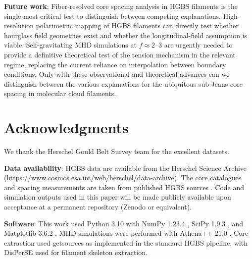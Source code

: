 \documentclass[11pt,a4paper]{article}
\begin{document}
\textbf{Future work}: Fiber-resolved core spacing analysis in HGBS filaments is the single most critical test to distinguish between competing explanations. High-resolution polarimetric mapping of HGBS filaments can directly test whether hourglass field geometries exist and whether the longitudinal-field assumption is viable. Self-gravitating MHD simulations at $f \approx 2$--$3$ are urgently needed to provide a definitive theoretical test of the tension mechanism in the relevant regime, replacing the current reliance on interpolation between boundary conditions. Only with these observational and theoretical advances can we distinguish between the various explanations for the ubiquitous sub-Jeans core spacing in molecular cloud filaments.

\section*{Acknowledgments}

We thank the Herschel Gould Belt Survey team for the excellent datasets.

\textbf{Data availability}: HGBS data are available from the Herschel Science Archive (\url{https://www.cosmos.esa.int/web/herschel/data-archive}). The core catalogues and spacing measurements are taken from published HGBS sources \citep{Konyves2015, Konyves2020, Andre2016}. Code and simulation outputs used in this paper will be made publicly available upon acceptance at a permanent repository (Zenodo or equivalent).

\textbf{Software}: This work used Python 3.10 \citep{Python2023} with NumPy 1.23.4 \citep{Harris2020}, SciPy 1.9.3 \citep{Virtanen2020}, and Matplotlib 3.6.2 \citep{Hunter2007}. MHD simulations were performed with Athena++ 21.0 \citep{Stone2020}. Core extraction used getsources \citep{Men'shchikov2012} as implemented in the standard HGBS pipeline, with DisPerSE \citep{Sousbie2011} used for filament skeleton extraction.



\end{document}
